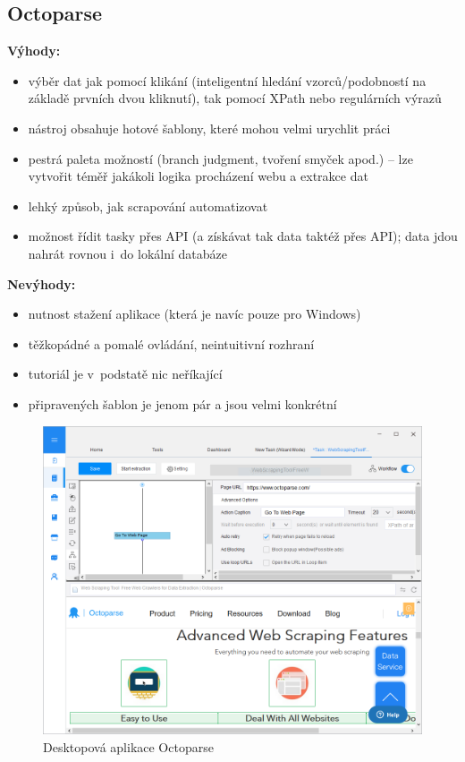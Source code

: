 \documentclass[thesis=B,czech]{FITthesis}[2012/06/26]
\begin{document}
\subsection{Octoparse}
\textbf{Výhody:}
\begin{itemize}
	\item výběr dat jak pomocí klikání (inteligentní hledání vzorců/podobností na základě prvních dvou kliknutí), tak pomocí XPath nebo regulárních výrazů
	\item nástroj obsahuje hotové šablony, které mohou velmi urychlit práci
	\item pestrá paleta možností (branch judgment, tvoření smyček apod.) -- lze vytvořit téměř jakákoli logika procházení webu a extrakce dat
	\item lehký způsob, jak scrapování automatizovat
	\item možnost řídit tasky přes API (a získávat tak data taktéž přes API); data jdou nahrát rovnou i~do lokální databáze
\end{itemize}
\textbf{Nevýhody:}
\begin{itemize}
	\item nutnost stažení aplikace (která je navíc pouze pro Windows)
	\item těžkopádné a pomalé ovládání, neintuitivní rozhraní
	\item tutoriál je v~podstatě nic neříkající
	\item připravených šablon je jenom pár a jsou velmi konkrétní
\end{itemize}
\begin{figure}[h]
	\includegraphics[width=\linewidth]{images/Octoparse.png}
	\caption[Desktopová aplikace Octoparse]{Desktopová aplikace Octoparse~\cite[snímek pořídil autor]{octoparse}}
	\label{fig:octoparse}
\end{figure}
\end{document}

